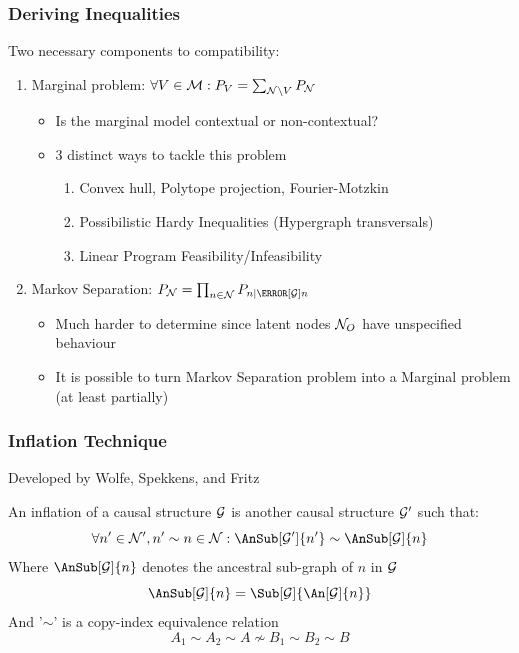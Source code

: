 \documentclass[
    hyperref={bookmarks=false},%
    xcolor={dvipsnames},
]{beamer}
\renewcommand{\term}[1]{\textcolor{Mahogany}{#1}}
\begin{document}
\begin{frame}
    \frametitle{Deriving Inequalities}
    Two necessary components to compatibility:
    \begin{enumerate}
        \item \term{Marginal problem}: $\forall V \in \mscenario : \prob[V] = \sum_{\nodes \setminus V} \prob[\nodes]$
        \begin{itemize}
            \item Is the marginal model contextual or non-contextual?
            \item 3 distinct ways to tackle this problem
            \begin{enumerate}
                \item Convex hull, Polytope projection, Fourier-Motzkin
                \item Possibilistic Hardy Inequalities (Hypergraph transversals)
                \item Linear Program Feasibility/Infeasibility
            \end{enumerate}
        \end{itemize}
        \item \term{Markov Separation}: $\prob[\nodes] = \prod_{n\in\nodes}\prob[n \mid \Pa[\graph]{n}]$
        \begin{itemize}
            \item Much harder to determine since latent nodes $\mathcal{N}_O$ have unspecified behaviour
            \item It is possible to turn Markov Separation problem into a Marginal problem (at least partially)
        \end{itemize}
    \end{enumerate}
\end{frame}

\begin{frame}
    \frametitle{Inflation Technique}
    Developed by Wolfe, Spekkens, and Fritz \cite{Inflation}
    \begin{definition}
        An \term{inflation} of a causal structure $\mathcal{G}$ is another causal structure $\mathcal{G}'$ such that:
        \[ \forall n' \in \nodes', n' \sim n \in \nodes: \AnSub[\graph']{n'} \sim \AnSub[\graph]{n} \]
        Where $\AnSub[\graph]{n}$ denotes the ancestral sub-graph of $n$ in $\mathcal{G}$
        \[ \AnSub[\graph]{n} = \Sub[\graph]{\An[\graph]{n}} \]
        And '$\sim$' is a \term{copy-index} equivalence relation
        \[ A_1 \sim A_2 \sim A \not \sim B_1 \sim B_2 \sim B \]
    \end{definition}
\end{frame}
\end{document}
